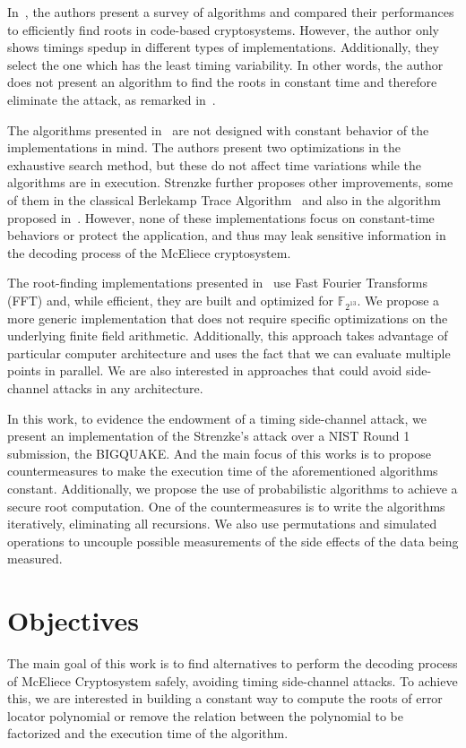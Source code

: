 In~\cite{strenzke2012fast}, the authors present a survey of algorithms and compared their performances to efficiently find roots in code-based cryptosystems. However, the author only shows timings spedup in different types of implementations. Additionally, they select the one which has the least timing variability. In other words, the author does not present an algorithm to find the roots in constant time and therefore eliminate the attack, as remarked in~\cite{strenzke2013efficiency}.

The algorithms presented in~\cite{strenzke2012fast} are not designed with constant behavior of the implementations in mind. The authors present two optimizations in the exhaustive search method, but these do not affect time variations while the algorithms are in execution. Strenzke further proposes other improvements, some of them in the classical Berlekamp Trace Algorithm~\cite{berlekamp1970factoring} and also in the algorithm proposed in~\cite{fedorenko2002finding}. However, none of these implementations focus on constant-time behaviors or protect the application, and thus may leak sensitive information in the decoding process of the McEliece cryptosystem.

The root-finding implementations presented in~\cite{chou2017mcbits, bernstein2013mcbits} use Fast Fourier Transforms (FFT) and, while efficient, they are built and optimized for $\mathbb{F}_{2^{13}}$. We propose a more generic implementation that does not require specific optimizations on the underlying finite field arithmetic. Additionally, this approach takes advantage of particular computer architecture and uses the fact that we can evaluate multiple points in parallel. We are also interested in approaches that could avoid side-channel attacks in any architecture. 

In this work, to evidence the endowment of a timing side-channel attack, we present an implementation of the Strenzke's attack over a NIST Round 1 submission, the BIGQUAKE. And the main focus of this works is to propose countermeasures to make the execution time of the aforementioned algorithms constant. Additionally, we propose the use of probabilistic algorithms to achieve a secure root computation. One of the countermeasures is to write the algorithms iteratively, eliminating all recursions. We also use permutations and simulated operations to uncouple possible measurements of the side effects of the data being measured.

\section{Objectives}
The main goal of this work is to find alternatives to perform the decoding process of McEliece Cryptosystem safely, avoiding timing side-channel attacks. To achieve this, we are interested in building a constant way to compute the roots of error locator polynomial or remove the relation between the polynomial to be factorized and the execution time of the algorithm.


